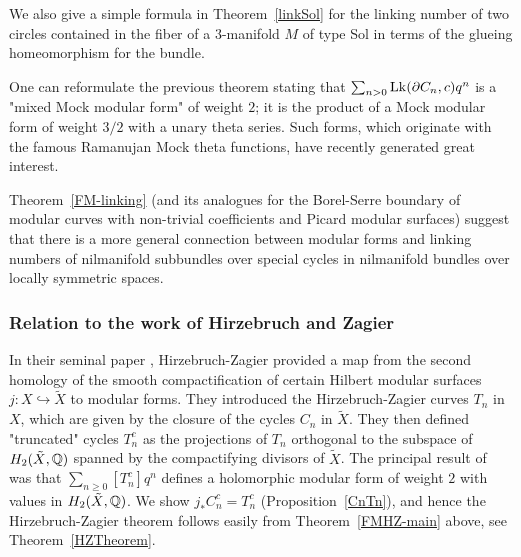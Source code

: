 We also give a simple formula in Theorem~\ref{linkSol} for the linking number of two circles contained in the fiber of a $3$-manifold $M$ of type Sol in terms of the glueing homeomorphism for the bundle.

One can reformulate the previous theorem stating that $\sum_{n>0}\operatorname{Lk}(\partial C_n,c) q^n$ is a "mixed Mock modular form" of weight $2$; it is the product of a Mock modular form of weight $3/2$ with a unary theta series. Such forms, which originate with the famous Ramanujan Mock theta functions, have recently generated great interest. 

Theorem~\ref{FM-linking} (and its analogues for the Borel-Serre boundary of modular curves with non-trivial coefficients and Picard modular surfaces) suggest that there is a more general connection between modular forms and linking numbers of nilmanifold subbundles over special cycles in nilmanifold  bundles over locally symmetric spaces. 









\subsubsection*{Relation to the work of Hirzebruch and Zagier}

In their seminal paper \cite{HZ}, Hirzebruch-Zagier provided a map from the second homology of the smooth compactification of certain Hilbert modular surfaces $j:X \hookrightarrow \tilde{X}$ to modular forms. They introduced the Hirzebruch-Zagier curves $T_n$ in $X$, which are given by the closure of the cycles $C_n$ in $\tilde{X}$. They then defined "truncated" cycles $T_n^c$ as the
projections of $T_n$ orthogonal to the subspace of $H_2(\tilde{X},\mathbb{Q})$ spanned by the 
compactifying divisors of $\tilde{X}$. The principal result of \cite{HZ} was that $\sum_{n \geq 0} [T_n^c] q^n$ defines a holomorphic modular form of weight $2$ with values in $H_2(\tilde{X},\mathbb{Q})$.
We show $j_{\ast} C_n^c = T_n^c$ (Proposition~\ref{CnTn}), and hence the Hirzebruch-Zagier theorem follows easily from Theorem~\ref{FMHZ-main} above, see Theorem~\ref{HZTheorem}.

